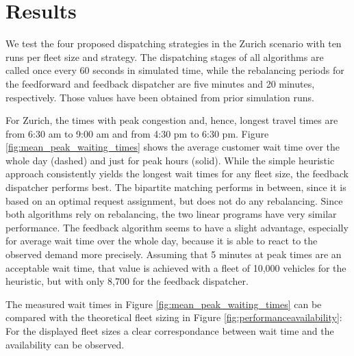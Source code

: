 \section{Results}
\label{sec:results}

We test the four proposed dispatching strategies in the Zurich scenario with ten
runs per fleet size and strategy. The dispatching stages of all algorithms are called once every 60 seconds in
simulated time, while the rebalancing periods for the feedforward and feedback
dispatcher are five minutes and 20 minutes, respectively. Those values have been
obtained from prior simulation runs.

For Zurich, the times with peak congestion and, hence, longest travel times
are from 6:30 am to 9:00 am and from 4:30 pm to 6:30 pm. Figure \ref{fig:mean_peak_waiting_times}
shows the average customer wait time over the whole day (dashed) and just for peak hours (solid).
While the simple heuristic approach consistently yields the longest wait times
for any fleet size, the feedback dispatcher performs best. The bipartite matching
performs in between, since it is based on an optimal request assignment, but does
not do any rebalancing. Since both algorithms rely on rebalancing, the two linear
programs have very similar performance. The feedback algorithm seems to have a
slight advantage, especially for average wait time over the whole day, because it
is able to react to the observed demand more precisely. Assuming that 5 minutes at
peak times are an acceptable wait time, that value is
achieved with a fleet of 10,000 vehicles for the heuristic, but with only 8,700
for the feedback dispatcher.

The measured wait times in Figure \ref{fig:mean_peak_waiting_times} can be compared
with the theoretical fleet sizing in Figure \ref{fig:performanceavailability}: For the
displayed fleet sizes a clear correspondance between wait time and the availability
can be observed.

\captionsetup[subfigure]{width=0.9\textwidth}

